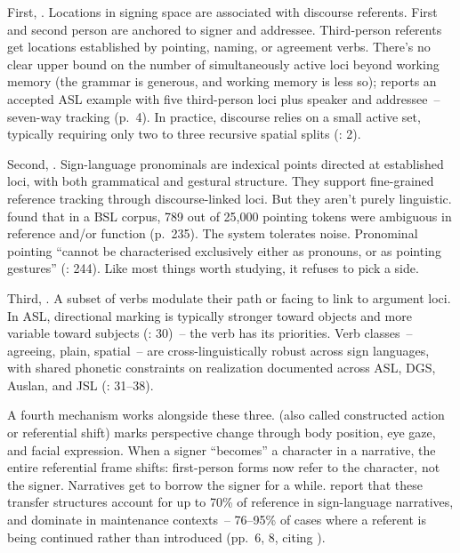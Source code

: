 First, . Locations in signing space are associated with discourse referents. First and second person are anchored to signer and addressee. Third-person referents get locations established by pointing, naming, or agreement verbs. There's no clear upper bound on the number of simultaneously active loci beyond working memory (the grammar is generous, and working memory is less so); \textcite{schlenker2017} reports an accepted ASL example with five third-person loci plus speaker and addressee~-- seven-way tracking (p.~4). In practice, discourse relies on a small active set, typically requiring only two to three recursive spatial splits (\citealt{steinbach2016}: 2).

Second, . Sign-language pronominals are indexical points directed at established loci, with both grammatical and gestural structure. They support fine-grained reference tracking through discourse-linked loci. But they aren't purely linguistic. \textcite{cormier2013} found that in a BSL corpus, 789 out of 25,000 pointing tokens were ambiguous in reference and/or function (p.~235). The system tolerates noise. Pronominal pointing \enquote{cannot be characterised exclusively either as pronouns, or as pointing gestures} (\citealt{cormier2013}: 244). Like most things worth studying, it refuses to pick a side.

Third, . A subset of verbs modulate their path or facing to link to argument loci. In ASL, directional marking is typically stronger toward objects and more variable toward subjects (\citealt{sandler2006}: 30)~-- the verb has its priorities. Verb classes~-- agreeing, plain, spatial~-- are cross-linguistically robust across sign languages, with shared phonetic constraints on realization documented across ASL, DGS, Auslan, and JSL (\citealt{sandler2006}: 31--38).

A fourth mechanism works alongside these three.  (also called constructed action or referential shift) marks perspective change through body position, eye gaze, and facial expression. When a signer \enquote{becomes} a character in a narrative, the entire referential frame shifts: first-person forms now refer to the character, not the signer. Narratives get to borrow the signer for a while. \textcite{garcia2020} report that these transfer structures account for up to 70\% of reference in sign-language narratives, and dominate in maintenance contexts~-- 76--95\% of cases where a referent is being continued rather than introduced (pp.~6, 8, citing \citealt{pizzuto2011}).

